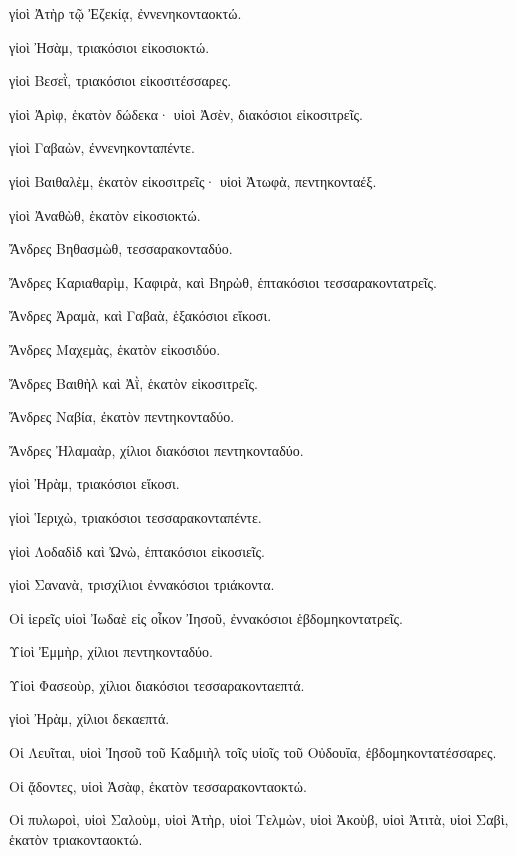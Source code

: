 {\par }{\PP {}γἱοὶ Ἀτὴρ τῷ Ἐζεκίᾳ, ἐννενηκονταοκτώ.
\par }{\PP {}γἱοὶ Ἠσὰμ, τριακόσιοι εἰκοσιοκτώ.
\par }{\PP {}γἱοὶ Βεσεῒ, τριακόσιοι εἰκοσιτέσσαρες.
\par }{\PP {}γἱοὶ Ἀρὶφ, ἑκατὸν δώδεκα· υἱοὶ Ἀσὲν, διακόσιοι εἰκοσιτρεῖς.
\par }{\PP {}γἱοὶ Γαβαὼν, ἐννενηκονταπέντε.
\par }{\PP {}γἱοὶ Βαιθαλὲμ, ἑκατὸν εἰκοσιτρεῖς· υἱοὶ Ἀτωφὰ, πεντηκονταέξ.
\par }{\PP {}γἱοὶ Ἀναθὼθ, ἑκατὸν εἰκοσιοκτώ.
\par }{\PP {}Ἄνδρες Βηθασμὼθ, τεσσαρακονταδύο.
\par }{\PP {}Ἄνδρες Καριαθαρὶμ, Καφιρὰ, καὶ Βηρὼθ, ἑπτακόσιοι τεσσαρακοντατρεῖς.
\par }{\PP {}Ἄνδρες Ἀραμὰ, καὶ Γαβαὰ, ἑξακόσιοι εἴκοσι.
\par }{\PP {}Ἄνδρες Μαχεμὰς, ἑκατὸν εἰκοσιδύο.
\par }{\PP {}Ἄνδρες Βαιθὴλ καὶ Ἀῒ, ἑκατὸν εἰκοσιτρεῖς.
\par }{\PP {}Ἄνδρες Ναβία, ἐκατὸν πεντηκονταδύο.
\par }{\PP {}Ἄνδρες Ἠλαμαὰρ, χίλιοι διακόσιοι πεντηκονταδύο.
\par }{\PP {}γἱοὶ Ἠρὰμ, τριακόσιοι εἴκοσι.
\par }{\PP {}γἱοὶ Ἱεριχὼ, τριακόσιοι τεσσαρακονταπέντε.
\par }{\PP {}γἱοὶ Λοδαδὶδ καὶ Ὠνὼ, ἑπτακόσιοι εἰκοσιεῖς.
\par }{\PP {}γἱοὶ Σανανὰ, τρισχίλιοι ἐννακόσιοι τριάκοντα.
\par }{\PP {}Οἱ ἱερεῖς υἱοὶ Ἰωδαὲ εἰς οἶκον Ἰησοῦ, ἐννακόσιοι ἑβδομηκοντατρεῖς.
\par }{\PP {}Υἱοὶ Ἐμμὴρ, χίλιοι πεντηκονταδύο.
\par }{\PP {}Υἱοὶ Φασεοὺρ, χίλιοι διακόσιοι τεσσαρακονταεπτά.
\par }{\PP {}γἱοὶ Ἠρὰμ, χίλιοι δεκαεπτά.
\par }{\PP {}Οἱ Λευῖται, υἱοὶ Ἰησοῦ τοῦ Καδμιὴλ τοῖς υἱοῖς τοῦ Οὐδουΐα, ἑβδομηκοντατέσσαρες.
\par }{\PP {}Οἱ ᾄδοντες, υἱοὶ Ἀσὰφ, ἑκατὸν τεσσαρακονταοκτώ.
\par }{\PP {}Οἱ πυλωροὶ, υἱοὶ Σαλοὺμ, υἱοὶ Ἀτὴρ, υἱοὶ Τελμὼν, υἱοὶ Ἀκοὺβ, υἱοὶ Ἀτιτὰ, υἱοὶ Σαβὶ, ἑκατὸν τριακονταοκτώ.
}

